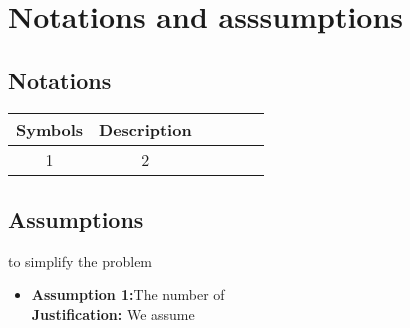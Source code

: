 \section{Notations and asssumptions}
\subsection{Notations}

\begin{table}[!h]
\centering
\begin{tabular}{cccccc}
    
    \toprule
    Symbols & Description \\ 
    \midrule
    1 & 2 \\
    \bottomrule
\end{tabular}
\end{table}

\subsection{Assumptions}

to simplify the problem

\begin{itemize}
    \item \textbf{Assumption 1:}The number of\\
    \textbf{Justification:} We assume
\end{itemize}